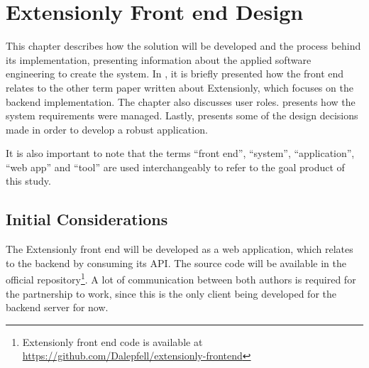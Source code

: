 \chapter{Extensionly Front end Design}\label{extensionly}

This chapter describes how the solution will be developed and the process behind its implementation, presenting information about the applied software engineering to create the system. In , it is briefly presented how the front end relates to the other term paper written about Extensionly, which focuses on the backend implementation. The chapter also discusses user roles.  presents how the system requirements were managed. Lastly,  presents some of the design decisions made in order to develop a robust application.

It is also important to note that the terms ``front end'', ``system'', ``application'', ``web app'' and ``tool'' are used interchangeably to refer to the goal product of this study.

\section{Initial Considerations}\label{ext:initial-considerations}

The Extensionly front end will be developed as a web application, which relates to the backend by consuming its \ac{API}. The source code will be available in the official repository\footnote{Extensionly front end code is available at \url{https://github.com/Dalepfell/extensionly-frontend}}. A lot of communication between both authors is required for the partnership to work, since this is the only client being developed for the backend server for now.

